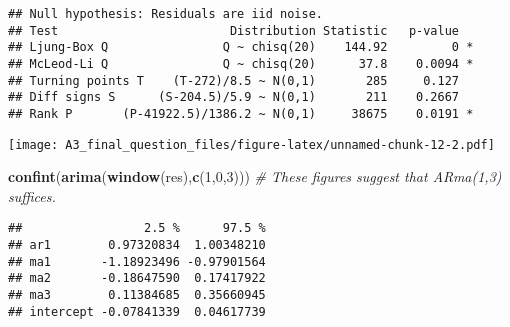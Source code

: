 \documentclass[]{article}
\newenvironment{Shaded}{\begin{snugshade}}{\end{snugshade}}
\newcommand{\CommentTok}[1]{\textcolor[rgb]{0.56,0.35,0.01}{\textit{#1}}}
\newcommand{\DecValTok}[1]{\textcolor[rgb]{0.00,0.00,0.81}{#1}}
\newcommand{\KeywordTok}[1]{\textcolor[rgb]{0.13,0.29,0.53}{\textbf{#1}}}
\newcommand{\NormalTok}[1]{#1}
\begin{document}
\begin{verbatim}
## Null hypothesis: Residuals are iid noise.
## Test                        Distribution Statistic   p-value
## Ljung-Box Q                Q ~ chisq(20)    144.92         0 *
## McLeod-Li Q                Q ~ chisq(20)      37.8    0.0094 *
## Turning points T    (T-272)/8.5 ~ N(0,1)       285     0.127
## Diff signs S      (S-204.5)/5.9 ~ N(0,1)       211    0.2667
## Rank P       (P-41922.5)/1386.2 ~ N(0,1)     38675    0.0191 *
\end{verbatim}

\texttt{[image: A3\_final\_question\_files/figure-latex/unnamed-chunk-12-2.pdf]}

\begin{Shaded}
\begin{Highlighting}[]
\KeywordTok{confint}\NormalTok{(}\KeywordTok{arima}\NormalTok{(}\KeywordTok{window}\NormalTok{(res),}\KeywordTok{c}\NormalTok{(}\DecValTok{1}\NormalTok{,}\DecValTok{0}\NormalTok{,}\DecValTok{3}\NormalTok{))) }\CommentTok{# These figures suggest that ARma(1,3) suffices.}
\end{Highlighting}
\end{Shaded}

\begin{verbatim}
##                 2.5 %      97.5 %
## ar1        0.97320834  1.00348210
## ma1       -1.18923496 -0.97901564
## ma2       -0.18647590  0.17417922
## ma3        0.11384685  0.35660945
## intercept -0.07841339  0.04617739
\end{verbatim}
\end{document}
